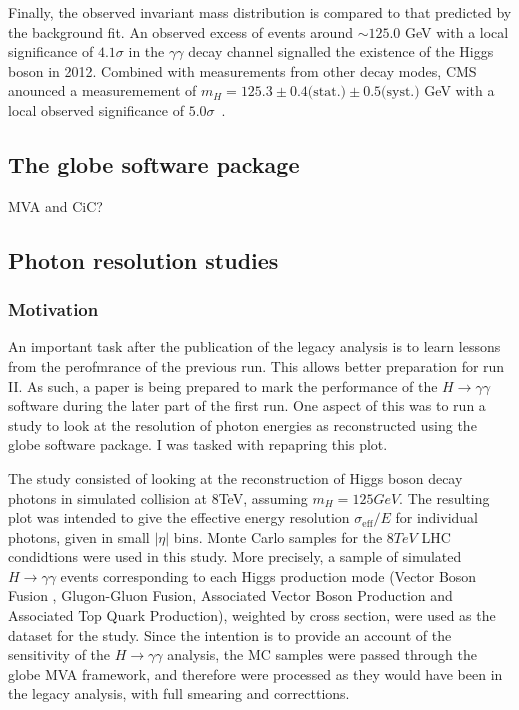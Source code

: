 \documentclass[10pt]{article}
\begin{document}
Finally, the observed invariant mass distribution is compared to that predicted by the background fit. An observed excess of events around $\sim125.0$ GeV with a local significance of $4.1 \sigma$ in the $\gamma \gamma$ decay channel signalled the existence of the Higgs boson in 2012. Combined with measurements from other decay modes, CMS anounced a measuremement of $m_H=125.3 \pm 0.4 \text{(stat.)} \pm 0.5 \text{(syst.)}$ GeV with a local observed significance of $5.0 \sigma$~\cite{HDisc}.

\subsection{The globe software package}

MVA and CiC?

\subsection{Photon resolution studies}

\subsubsection{Motivation}

An important task after the publication of the legacy analysis is to learn lessons from the perofmrance of the previous run. This allows better preparation for run II. As such, a paper is being prepared to mark the performance of the $H \rightarrow \gamma\gamma$ software during the later part of the first run. One aspect of this was to run a study to look at the resolution of photon energies as reconstructed using the globe software package. I was tasked with repapring this plot.

The study consisted of looking at the reconstruction of Higgs boson decay photons in simulated collision at 8TeV, assuming $m_H = 125GeV$. The resulting plot was intended to give the effective energy resolution $\sigma_{\text{eff}}/E$ for individual photons, given in small $|\eta|$ bins.
Monte Carlo samples for the $8TeV$ LHC condidtions were used in this study. More precisely, a sample of simulated $H \rightarrow \gamma \gamma$ events corresponding to each Higgs production mode (Vector Boson Fusion , Glugon-Gluon Fusion, Associated Vector Boson Production and Associated Top Quark Production), weighted by cross section, were used as the dataset for the study.
Since the intention is to provide an account of the sensitivity of the $H \rightarrow \gamma\gamma$ analysis, the MC samples were passed through the globe MVA framework, and therefore were processed as they would have been in the legacy analysis, with full smearing and correcttions.
\end{document}
